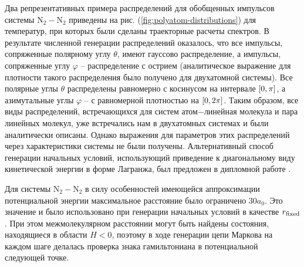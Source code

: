 Два репрезентативных примера распределений для обобщенных импульсов системы N$_2-$N$_2$  приведены на рис. (\ref{fig:polyatom-distributions}) для температур, при которых были сделаны траекторные расчеты спектров. В результате численной генерации распределений оказалось, что все импульсы, сопряженные полярному углу $\theta$, имеют гауссово распределение, а импульсы, сопряженные углу $\varphi$ -- распределение с острием (аналитическое выражение для плотности такого распределения было получено для двухатомной системы). Все полярные углы $\theta$ распределены равномерно с косинусом на интервале $\left[ 0, \pi \right]$, а азимутальные углы $\varphi$ -- с равномерной плотностью на $\left[ 0, 2\pi \right]$. Таким образом, все виды распределений, встречающихся для систем атом$-$линейная молекула и пара линейных молекул, уже встречались нам в двухатомных системах и были аналитически описаны. Однако выражения для параметров этих распределений через характеристики системы не были получены. Альтернативный способ генерации начальных условий, использующий приведение к диагональному виду кинетической энергии в форме Лагранжа, был предложен в дипломной работе \cite{chistikov-diplom}. \par 
Для системы N$_2-$N$_2$ в силу особенностей имеющейся аппроксимации потенциальной энергии максимальное расстояние было ограничено $30 a_0$. Это значение и было использовано при генерации начальных условий в качестве $r_\text{fixed}$. При этом межмолекулярном расстоянии могут быть найдены состояния, находящиеся в области $H < 0$, поэтому в ходе генерации цепи Маркова на каждом шаге делалась проверка знака гамильтониана в потенциальной следующей точке.
\setcounter{figure}{7}
